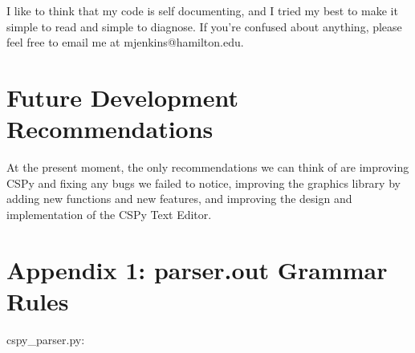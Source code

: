 \documentclass{article}
\begin{document}
I like to think that my code is self documenting, and I tried my best to make it simple to read and simple to diagnose. If you're confused about anything, please feel free to email me at mjenkins@hamilton.edu.

\pagebreak

\section{Future Development Recommendations}
At the present moment, the only recommendations we can think of are improving CSPy and fixing any bugs we failed to notice, improving the graphics library by adding new functions and new features, and improving the design and implementation of the CSPy Text Editor.
\pagebreak
\section{Appendix 1: parser.out Grammar Rules}
cspy\_parser.py:
\end{document}
